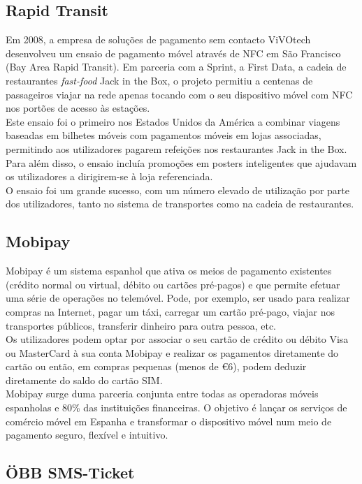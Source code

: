 \subsection{Rapid Transit}

Em 2008, a empresa de soluções de pagamento sem contacto ViVOtech desenvolveu um ensaio de pagamento móvel através de NFC em São Francisco (Bay Area Rapid Transit). Em parceria com a Sprint, a First Data, a cadeia de restaurantes \textit{fast-food} Jack in the Box, o projeto permitiu a centenas de passageiros viajar na rede apenas tocando com o seu dispositivo móvel com NFC nos portões de acesso às estações.
\\Este ensaio foi o primeiro nos Estados Unidos da América a combinar viagens baseadas em bilhetes móveis com pagamentos móveis em lojas associadas, permitindo aos utilizadores pagarem refeições nos restaurantes Jack in the Box. Para além disso, o ensaio incluía promoções em posters inteligentes que ajudavam os utilizadores a dirigirem-se à loja referenciada.
\\O ensaio foi um grande sucesso, com um número elevado de utilização por parte dos utilizadores, tanto no sistema de transportes como na cadeia de restaurantes.\cite{NFCForum2011} \cite{Casey2000}

\subsection{Mobipay}

Mobipay é um sistema espanhol que ativa os meios de pagamento existentes (crédito normal ou virtual, débito ou cartões pré-pagos) e que permite efetuar uma série de operações no telemóvel. Pode, por exemplo, ser usado para realizar compras na Internet, pagar um táxi, carregar um cartão pré-pago, viajar nos transportes públicos, transferir dinheiro para outra pessoa, etc.
\\Os utilizadores podem optar por associar o seu cartão de crédito ou débito Visa ou MasterCard à sua conta Mobipay e realizar os pagamentos diretamente do cartão ou então, em compras pequenas (menos de \euro 6), podem deduzir diretamente do saldo do cartão SIM.
\\Mobipay surge duma parceria conjunta entre todas as operadoras móveis espanholas e 80\% das instituições financeiras. O objetivo é lançar os serviços de comércio móvel em Espanha e transformar o dispositivo móvel num meio de pagamento seguro, flexível e intuitivo. \cite{atos}

\subsection{ÖBB SMS-Ticket}


